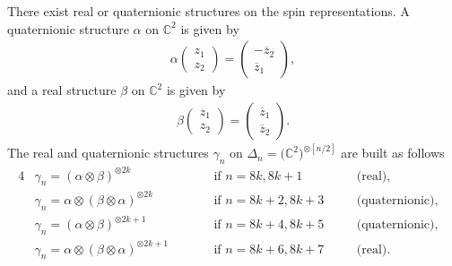 \documentclass[pdftex]{sigma}
\numberwithin{equation}{section}
\begin{document}
There exist real or quaternionic structures on the spin representations. A quaternionic structure $\alpha$ on $\mathbb{C}^2$ is given by
\begin{gather*}\alpha\left(\begin{matrix}
z_1\\
z_2
 \end{matrix}
\right) = \left(\begin{matrix}
-\overline{z}_2\\
\overline{z}_1
 \end{matrix}\right),\end{gather*}
and a real structure $\beta$ on $\mathbb{C}^2$ is given by
\begin{gather*} \beta\left(\begin{matrix}
z_1\\
z_2
 \end{matrix}
\right) = \left(\begin{matrix}
\overline{z}_1\\
\overline{z}_2
 \end{matrix}\right).\end{gather*}
The real and quaternionic structures $\gamma_n$ on $\Delta_n=\big(\mathbb{C}^2\big)^{\otimes [n/2]}$ are built as follows
\begin{alignat*}{4}
& \gamma_n= (\alpha\otimes\beta)^{\otimes 2k} \qquad &&\text{if $n=8k,8k+1$} \quad && \text{(real)},& \\
& \gamma_n= \alpha\otimes(\beta\otimes\alpha)^{\otimes 2k} \qquad &&\text{if $n=8k+2,8k+3$}\quad && \text{(quaternionic)},& \\
& \gamma_n= (\alpha\otimes\beta)^{\otimes 2k+1} \qquad & &\text{if $n=8k+4,8k+5$}\quad &&\text{(quaternionic)},& \\
& \gamma_n= \alpha\otimes(\beta\otimes\alpha)^{\otimes 2k+1} \qquad &&\text{if $n=8k+6,8k+7$}\quad &&\text{(real)}.&
\end{alignat*}
\end{document}
